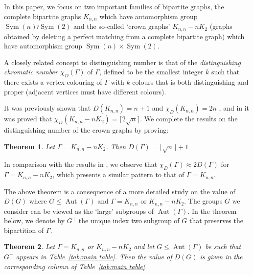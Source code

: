 \documentclass[11pt]{amsart}
\newtheorem{theorem}{Theorem}[section]
\DeclareMathOperator{\Sym}{Sym}
\DeclareMathOperator{\Aut}{Aut}
\begin{document}
In this paper, we focus on two important families of bipartite graphs, the complete bipartite graphs \(K_{n,n}\) which have automorphism group $\Sym(n)\wr \Sym(2)$ and the so-called `crown graphs' \(K_{n,n}-nK_{2}\) (graphs obtained by deleting a perfect matching from a complete bipartite graph) which have automorphism group $\Sym(n)\times \Sym(2)$. 



A closely related concept to distinguishing number is that of  the \emph{distinguishing chromatic number \(\chi_{D}(\Gamma)\)} of \(\Gamma\), defined to be the smallest integer \(k\) such that there exists a vertex-colouring of $\Gamma$ with \(k\) colours  that  is both distinguishing and proper (adjacent vertices must have different colours).

 
It was previously shown that  \(D(K_{n,n})=n+1\) \cite[Theorem 2.4]{CT2006} and  \(\chi_{D}(K_{n,n})=2n\) \cite[Theorem 2.3]{CT2006}, and in \cite{P2009} it was proved that \(\chi_{D}(K_{n,n}-nK_{2})=\lceil 2\sqrt{n}\rceil\). We complete the results on the distinguishing number of the crown graphs by proving:

\begin{theorem}
\label{intro thm: dno of crown}
    Let $\Gamma=K_{n,n}-nK_2$. Then $D(\Gamma)=\lfloor \sqrt{n}\rfloor +1$
\end{theorem}
In  comparison with the results in \cite[Theorem 1]{P2009}, we observe that \(\chi_{D}(\Gamma) \approx  2D(\Gamma)\) for \(\Gamma=K_{n,n}-nK_{2}\), which presents a similar pattern to that of \(\Gamma=K_{n,n}\).

The above theorem is a consequence of a more detailed study on the value of \(D(G)\) where \(G\leqslant \Aut(\Gamma)\) and \(\Gamma=K_{n,n}\) or \(K_{n,n}-nK_{2}\). The groups $G$ we consider can be viewed as the `large' subgroups of $\Aut(\Gamma)$. In the theorem below, we  denote by $G^+$ the unique index two subgroup of $G$ that preserves the bipartition of $\Gamma$.
\begin{theorem}
\label{intro thm: table values}
      Let $\Gamma=K_{n,n}$ or $K_{n,n}-nK_2$  and let $G  \leqslant \Aut(\Gamma)$ be such that $G^+$ appears in Table~\ref{tab:main table}. Then the value of  $D(G)$ is given in the corresponding column of Table~\ref{tab:main table}.
\end{theorem}
\end{document}
